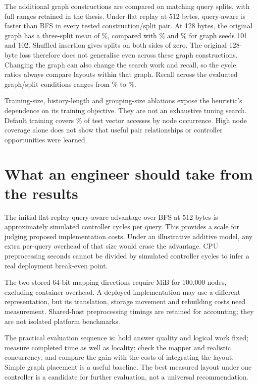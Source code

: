 \documentclass[conference]{IEEEtran}
\begin{document}
The additional graph constructions are compared on matching query splits, with full ranges retained in the thesis. Under flat replay at 512 bytes, query-aware is faster than BFS in every tested construction/split pair. At 128 bytes, the original graph has a three-split mean of \GraphRefCompact\%, compared with \GraphOneCompact\% and \GraphTwoCompact\% for graph seeds 101 and 102. Shuffled insertion gives splits on both sides of zero. The original 128-byte loss therefore does not generalise even across these graph constructions. Changing the graph can also change the search work and recall, so the cycle ratios always compare layouts within that graph. Recall across the evaluated graph/split conditions ranges from \GraphRecallMin\% to \GraphRecallMax\%.



Training-size, history-length and grouping-size ablations expose the heuristic's dependence on its training objective. They are not an exhaustive tuning search. Default training covers \MeanCoverage\% of test vector accesses by node occurrence. High node coverage alone does not show that useful pair relationships or controller opportunities were learned.



\section{What an engineer should take from the results}
The initial flat-replay query-aware advantage over BFS at 512 bytes is approximately \SavedCyclesPerQuery{} simulated controller cycles per query. This provides a scale for judging proposed implementation costs. Under an illustrative additive model, any extra per-query overhead of that size would erase the advantage. CPU preprocessing seconds cannot be divided by simulated controller cycles to infer a real deployment break-even point.

The two stored 64-bit mapping directions require \MappingMiB{} MiB for 100,000 nodes, excluding container overhead. A deployed implementation may use a different representation, but its translation, storage movement and rebuilding costs need measurement. Shared-host preprocessing timings are retained for accounting; they are not isolated platform benchmarks.

The practical evaluation sequence is: hold answer quality and logical work fixed; measure completed time as well as locality; check the mapper and realistic concurrency; and compare the gain with the costs of integrating the layout. Simple graph placement is a useful baseline. The best measured layout under one controller is a candidate for further evaluation, not a universal recommendation.
\end{document}
